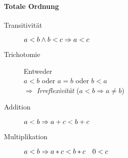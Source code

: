 \paragraph{Totale Ordnung}

\begin{description}
  \item [Transitivität]
        $\linebreak a < b \land b < c \Rightarrow a < c$

  \item [Trichotomie] Entweder \\
        $a < b$ oder $a = b$ oder $b < a$ \\
        $\Rightarrow$ \emph{Irreflexivität} ($a < b \Rightarrow a \neq b$)

  \item [Addition]
        $\linebreak a < b \Rightarrow a + c < b + c$

  \item [Multiplikation]
        $\linebreak a < b \Rightarrow a * c < b * c \quad 0 < c$
\end{description}

% 
% 
% 


